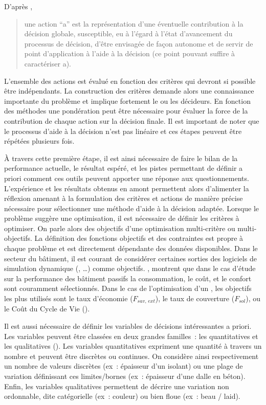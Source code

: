 \noindent D’après \textcite{Roy1985}, \blockquote{une action \enquote{a} est la représentation d’une
éventuelle contribution à la décision globale, susceptible, eu à l’égard à l’état
d’avancement du processus de décision, d’être envisagée de façon autonome et de servir de
point d’application à l’aide à la décision (ce point pouvant suffire à caractériser a).}
L’ensemble des actions est évalué en fonction des critères qui devront si possible être
indépendants. La construction des critères demande alors une connaissance importante du
problème et implique fortement le ou les décideurs. En fonction des méthodes une
pondération peut être nécessaire pour évaluer la force de la contribution de chaque action
sur la décision finale. Il est important de noter que le processus d’aide à la décision
n’est pas linéaire et ces étapes peuvent être répétées plusieurs fois.

À travers cette première étape, il est ainsi nécessaire de faire le bilan de la
performance actuelle, le résultat espéré, et les pistes permettant de définir a priori
comment ces outils peuvent apporter une réponse aux questionnements. L’expérience et les
résultats obtenus en amont permettent alors d’alimenter la réflexion amenant à la
formulation des critères et actions de manière précise nécessaire pour sélectionner une
méthode d’aide à la décision adaptée. Lorsque le problème suggère une optimisation, il est
nécessaire de définir les critères à optimiser. On parle alors des objectifs d’une
optimisation multi-critère ou multi-objectifs. La définition des fonctions objectifs et des
contraintes est propre à chaque problème et est directement dépendante des données
disponibles. Dans le secteur du bâtiment, il est courant de considérer certaines sorties
des logiciels de simulation dynamique (, \dots) comme objectifs.
\textcite{Attia2013110}, montrent que dans le cas d’étude sur la performance des bâtiment
passifs la consommation, le coût, et le confort sont couramment sélectionnés. Dans le cas
de l’optimisation d’un , les objectifs les plus utilisés sont le taux d’économie ($F_{sav,\, ext}$),
le taux de couverture ($F_{sol}$), ou le Coût du Cycle de Vie ().

Il est aussi nécessaire de définir les variables de décisions intéressantes a priori.
Les variables peuvent être classées en deux grandes familles~: les quantitatives et
les qualitatives ().
Les variables quantitatives expriment une quantité à travers un nombre et
peuvent être discrètes ou continues. On considère ainsi respectivement un nombre de
valeurs discrètes (ex~: épaisseur d’un isolant) ou une plage de variation définissant
ces limites/bornes (ex~: épaisseur d’une dalle en béton).
Enfin, les variables qualitatives permettent de décrire une variation non ordonnable,
dite catégorielle (ex~: couleur) ou bien floue (ex~: beau / laid).

